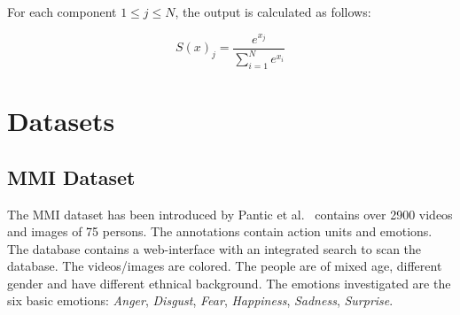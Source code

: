 \documentclass[10pt,journal,compsoc, hidelinks]{IEEEtran}
\begin{document}
For each component $1 \leq j \leq N$, the output is calculated as follows:

\begin{center}
\begin{minipage}{0.5\columnwidth}
\begin{equation}
S(x)_j = \frac{e^{x_j}}{\sum_{i=1}^Ne^{x_i}}
\end{equation}
\end{minipage}
\end{center}
 \section{Datasets}
\label{sec:datasets}
\newcommand{\mmiColWidth}{0.15\columnwidth}
\newcommand{\hspacing}{15mm}
\subsection{MMI Dataset}
\label{sec:mmi}
The MMI dataset has been introduced by Pantic et al.~\cite{Pantic2005wdffe} contains over 2900 videos and images of 75 persons.
The annotations contain action units and emotions. The database contains a web-interface with an integrated search to scan the database. The videos/images are colored. The people are of mixed age, different gender and have different ethnical background.
The emotions investigated are the six basic emotions: \textit{Anger}, \textit{Disgust}, \textit{Fear}, \textit{Happiness}, \textit{Sadness}, \textit{Surprise}.
\end{document}
